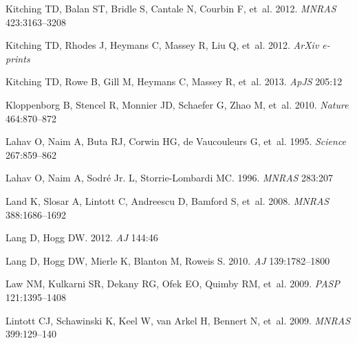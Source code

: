 \documentclass{ar2e}
\def\apjs{ApJS}
\def\mnras{MNRAS}
\def\aj{AJ}
\def\pasp{PASP}
\def\nat{Nature}
\begin{document}
\begin{thebibliography}{}
{Kitching} TD, {Balan} ST, {Bridle} S, {Cantale} N, {Courbin} F, et~al.
  2012{}.
\newblock \textit{\mnras} 423:3163--3208

{Kitching} TD, {Rhodes} J, {Heymans} C, {Massey} R, {Liu} Q, et~al.
  2012{}.
\newblock \textit{ArXiv e-prints}

{Kitching} TD, {Rowe} B, {Gill} M, {Heymans} C, {Massey} R, et~al. 2013.
\newblock \textit{\apjs} 205:12

{Kloppenborg} B, {Stencel} R, {Monnier} JD, {Schaefer} G, {Zhao} M, et~al.
  2010.
\newblock \textit{\nat} 464:870--872

{Lahav} O, {Naim} A, {Buta} RJ, {Corwin} HG, {de Vaucouleurs} G, et~al. 1995.
\newblock \textit{Science} 267:859--862

{Lahav} O, {Naim} A, {Sodr{\'e}} Jr. L, {Storrie-Lombardi} MC. 1996.
\newblock \textit{\mnras} 283:207

{Land} K, {Slosar} A, {Lintott} C, {Andreescu} D, {Bamford} S, et~al. 2008.
\newblock \textit{\mnras} 388:1686--1692

{Lang} D, {Hogg} DW. 2012.
\newblock \textit{\aj} 144:46

{Lang} D, {Hogg} DW, {Mierle} K, {Blanton} M, {Roweis} S. 2010.
\newblock \textit{\aj} 139:1782--1800

{Law} NM, {Kulkarni} SR, {Dekany} RG, {Ofek} EO, {Quimby} RM, et~al. 2009.
\newblock \textit{\pasp} 121:1395--1408

{Lintott} CJ, {Schawinski} K, {Keel} W, {van Arkel} H, {Bennert} N, et~al.
  2009.
\newblock \textit{\mnras} 399:129--140


\end{thebibliography}
\end{document}
